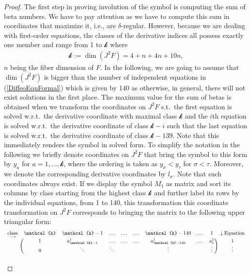 \begin{proof}
The first step in proving involution of the symbol is computing the sum of beta numbers. We have to pay attention as we have to compute this sum in coordinates that maximize it, i.e., are $\delta$-regular. However, because we are dealing with first-order equations, the classes of the derivative indices all possess exactly one member and range from 1 to $\mathcal{k}$ where
\begin{align}
    \mathcal{k} := \operatorname{dim}(J^2F) = 4+n+4n+10n,
\end{align}
$n$ being the fiber dimension of $F$. 
In the following, we are going to assume that $\operatorname{dim}(J^2F)$ is bigger than the number of independent equations in (\ref{DiffeoEqnFormal}) which is given by 140 as otherwise, in general, there will not exist solutions in the first place. 
The maximum value for the sum of betas is obtained when we transform the coordinates on $J^2F$ s.t.\ the first equation is solved w.r.t.\ the derivative coordinate with maximal class $\mathcal{k}$ and the $i$th equation is solved w.r.t.\ the derivative coordinate of class $\mathcal{k}-i$ such that the last equation is solved w.r.t.\ the derivative coordinate of class $\mathcal{k}-139$.
Note that this immediately renders the symbol in solved form.
To simplify the notation in the following we briefly denote coordinates on $J^2F$ that bring the symbol to this form by $y_a$ for $a = 1,...,\mathcal{k}$, where the ordering is taken as $y_{\sigma} < y_{\tau}$ for $\sigma < \tau$. Moreover, we denote the corresponding derivative coordinates by $l_{\sigma}$. 
Note that such coordinates always exist. 
If we display the symbol $M_1$ as matrix and sort its columns by class starting from the highest class $\mathcal{k}$ and further label its rows by the individual equations, from 1 to 140, this transformation this coordinate transformation on $J^2F$ corresponds to bringing the matrix to the following upper triangular form:
\begin{align}\label{symbolMat}
\begin{blockarray}{cccccccccc}
\underset{\longrightarrow}{\text{class}} & \mathcal{k} & \mathcal{k} -1 & \hdots & \hdots & \hdots & \mathcal{k}- 140 & \hdots & 1 & \downarrow \text{Equation} \\
\begin{block}{c(cccccccc)c}
   & 1 & a^1_{\mathcal{k}-1} & \hdots & \hdots & \hdots & a^1_{\mathcal{k} -140} & \hdots & a^1_1 & 1 \\
    & 0 & \ddots & \ddots & &  & \vdots & & \vdots & \vdots \\

\end{block}
\end{blockarray}
\end{align}
\end{proof}
